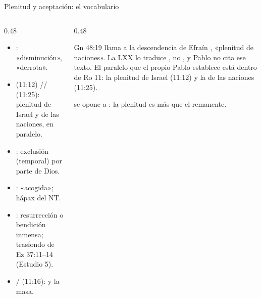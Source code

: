 \begin{frame}{Plenitud y aceptación: el vocabulario}
\begin{columns}[T,onlytextwidth]
\begin{column}{0.48\textwidth}\small\RaggedRight
\begin{itemize}
\item {}: «disminución», «derrota».
\item {} (11:12) //  (11:25): plenitud de Israel y de las naciones, en paralelo.
\item {}: exclusión (temporal) por parte de Dios.
\item {}: «acogida»; hápax del NT.
\item {}: resurrección o bendición inmensa; trasfondo de Ez 37:11--14 (Estudio 5).
\item {}/ (11:16):  y la masa.
\end{itemize}
\end{column}
\begin{column}{0.48\textwidth}
\begin{notalam}
Gn 48:19 llama a la descendencia de Efraín , «plenitud de naciones». La LXX lo traduce , no , y Pablo no cita ese texto. El paralelo que el propio Pablo establece está dentro de Ro 11: la plenitud de Israel (11:12) y la de las naciones (11:25).
\end{notalam}
\begin{clave} se opone a : la plenitud es más que el remanente.\end{clave}
\end{column}
\end{columns}
\end{frame}

